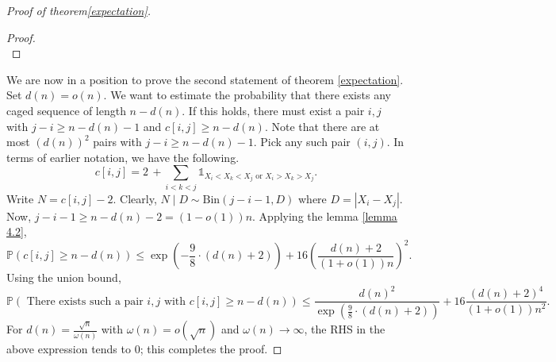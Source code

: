 \documentclass[10pt,a4paper]{amsart}
\begin{document}
\begin{proof}[Proof of theorem\ref{expectation}]
\begin{proof}
$$$$
\end{proof}
We are now in a position to prove the second statement of theorem \ref{expectation}. \\
Set $d(n)=o(n)$. We want to estimate the probability that there exists any caged sequence of length $n - d(n)$. If this holds, there must exist a pair $i, j $ with $j - i  \geq n - d(n) - 1$ and $c[i, j] \geq n - d(n)$. Note that there are at most $(d(n))^2$ pairs with $j - i \geq n - d(n) - 1$. Pick any such pair $(i, j)$. In terms of earlier notation, we have the following.
\[
   c[i, j] = 2 \, +  \displaystyle \sum_{i < k < j} \displaystyle  \mathbb{1}_{X_i < X_k <X_j \text{ or } X_i > X_k > X_j}. 
\]
Write $N = c[i, j] - 2$. Clearly, $N \mid D \sim \text{Bin}(j - i - 1, D)$ where $D = |X_i - X_j|$. Now, $j - i - 1 \geq n - d(n) - 2 = (1-o(1))n$. Applying the lemma \ref{lemma 4.2}, 
\[
  \mathbb{P}\left( c[i, j] \geq n - d(n) \right) \leq  \exp{\left(-\frac{9}{8}\cdot (d(n) + 2) \right)} + 16\left(\frac{d(n) + 2}{(1+o(1))n}\right)^2.
\]
Using the union bound, 
\[
\mathbb{P}\left( \text{ There exists such a pair $i, j$ with } c[i, j] \geq n - d(n) \right) \leq \frac{d(n)^2}{\exp{\left(\frac{9}{8}\cdot (d(n) + 2) \right)}} + 16\frac{(d(n) + 2)^4}{(1+o(1))n^2}.
\]
For $d(n) = \frac{\sqrt{n}}{\omega(n)}$ with $\omega(n) = o(\sqrt{n})$ and $\omega(n) \rightarrow \infty $, the RHS in the above expression tends to $0$; this completes the proof.
\end{proof}
\end{document}
